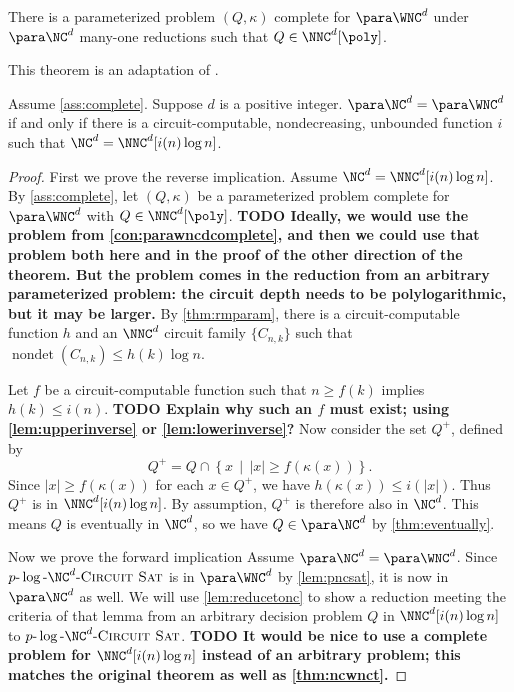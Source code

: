 \documentclass{article}
\newcommand{\todo}[1]{\textbf{TODO #1}}
\newcommand{\dash}{\textnormal{-}}
\newcommand{\pncsat}{p\dash\log\dash\NC^d\dash\textsc{Circuit Sat}}
\DeclareMathOperator{\nondet}{nondet}
\begin{document}
\begin{assumption}\label{ass:complete}
  There is a parameterized problem $(Q, \kappa)$ complete for $\para \WNC^d$ under $\para \NC^d$ many-one reductions such that $Q \in \NNC^d[\poly]$.
\end{assumption}

This theorem is an adaptation of \autocite[Theorem~3.29]{fg06}.

\begin{theorem}\label{thm:ncwnc}
  Assume \autoref{ass:complete}.
  Suppose $d$ is a positive integer.
  $\para \NC^d = \para \WNC^d$ if and only if there is a circuit-computable, nondecreasing, unbounded function $i$ such that $\NC^d = \NNC^d[i(n) \log n]$.
\end{theorem}
\begin{proof}
  First we prove the reverse implication.
  Assume $\NC^d = \NNC^d[i(n) \log n]$.
  By \autoref{ass:complete}, let $(Q, \kappa)$ be a parameterized problem complete for $\para \WNC^d$ with $Q \in \NNC^d[\poly]$.
  \todo{
    Ideally, we would use the problem from \autoref{con:parawncdcomplete}, and then we could use that problem both here and in the proof of the other direction of the theorem.
    But the problem comes in the reduction from an arbitrary parameterized problem: the circuit depth needs to be polylogarithmic, but it may be larger.
  }
  By \autoref{thm:rmparam}, there is a circuit-computable function $h$ and an $\NNC^d$ circuit family $\{C_{n, k}\}$ such that $\nondet(C_{n, k}) \leq h(k) \log n$.

  Let $f$ be a circuit-computable function such that $n \geq f(k)$ implies $h(k) \leq i(n)$.
  \todo{Explain why such an $f$ must exist; using \autoref{lem:upperinverse} or \autoref{lem:lowerinverse}?}
  Now consider the set $Q^+$, defined by
  \[
  Q^+ = Q \cap \left\{ x \, \middle| \, |x| \geq f(\kappa(x)) \right\}.
  \]
  Since $|x| \geq f(\kappa(x))$ for each $x \in Q^+$, we have $h(\kappa(x)) \leq i(|x|)$.
  Thus $Q^+$ is in $\NNC^d[i(n) \log n]$.
  By assumption, $Q^+$ is therefore also in $\NC^d$.
  This means $Q$ is eventually in $\NC^d$, so we have $Q \in \para \NC^d$ by \autoref{thm:eventually}.

  Now we prove the forward implication
  Assume $\para \NC^d = \para \WNC^d$.
  Since $\pncsat$ is in $\para \WNC^d$ by \autoref{lem:pncsat}, it is now in $\para \NC^d$ as well.
  We will use \autoref{lem:reducetonc} to show a reduction meeting the criteria of that lemma from an arbitrary decision problem $Q$ in $\NNC^d[i(n) \log n]$ to $\pncsat$.
  \todo{It would be nice to use a complete problem for $\NNC^d[i(n) \log n]$ instead of an arbitrary problem; this matches the original theorem as well as \autoref{thm:ncwnct}.}


\end{proof}
\end{document}
